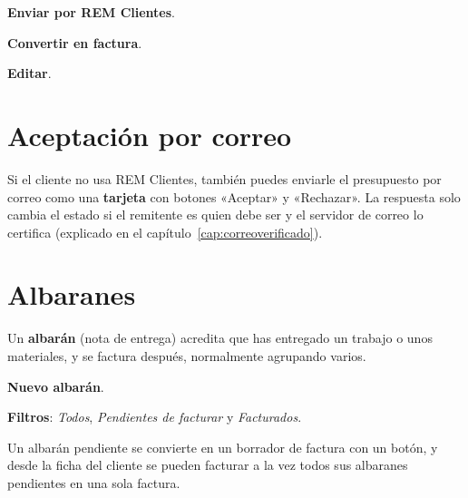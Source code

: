 \begin{leyenda}
\item[\mk{1}] \textbf{Enviar por REM Clientes}.
\item[\mk{2}] \textbf{Convertir en factura}.
\item[\mk{3}] \textbf{Editar}.
\end{leyenda}

\section{Aceptación por correo}
Si el cliente no usa REM Clientes, también puedes enviarle el presupuesto por correo como una \textbf{tarjeta} con botones «Aceptar» y «Rechazar». La respuesta solo cambia el estado si el remitente es quien debe ser y el servidor de correo lo certifica (explicado en el capítulo~\ref{cap:correoverificado}).

\section{Albaranes}
Un \textbf{albarán} (nota de entrega) acredita que has entregado un trabajo o unos materiales, y se factura después, normalmente agrupando varios.
\begin{leyenda}
\item[\mk{1}] \textbf{Nuevo albarán}.
\item[\mk{2}] \textbf{Filtros}: \emph{Todos}, \emph{Pendientes de facturar} y \emph{Facturados}.
\end{leyenda}
Un albarán pendiente se convierte en un borrador de factura con un botón, y desde la ficha del cliente se pueden facturar a la vez todos sus albaranes pendientes en una sola factura.
